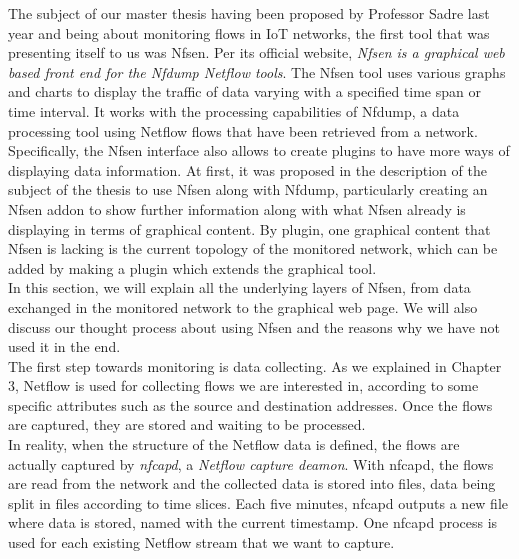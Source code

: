 The subject of our master thesis having been proposed by Professor Sadre last year and being about monitoring flows in IoT networks, the first tool that was presenting itself to us was Nfsen. Per its official website, \textit{Nfsen is a graphical web based front end for the Nfdump Netflow tools}. The Nfsen tool uses various graphs and charts to display the traffic of data varying with a specified time span or time interval. It works with the processing capabilities of Nfdump, a data processing tool using Netflow flows that have been retrieved from a network. Specifically, the Nfsen interface also allows to create plugins to have more ways of displaying data information. At first, it was proposed in the description of the subject of the thesis to use Nfsen along with Nfdump, particularly creating an Nfsen addon to show further information along with what Nfsen already is displaying in terms of graphical content. By plugin, one graphical content that Nfsen is lacking is the current topology of the monitored network, which can be added by making a plugin which extends the graphical tool.\\

In this section, we will explain all the underlying layers of Nfsen, from data exchanged in the monitored network to the graphical web page. We will also discuss our thought process about using Nfsen and the reasons why we have not used it in the end.\\

The first step towards monitoring is data collecting. As we explained in Chapter 3, Netflow is used for collecting flows we are interested in, according to some specific attributes such as the source and destination addresses. Once the flows are captured, they are stored and waiting to be processed. \\

In reality, when the structure of the Netflow data is defined, the flows are actually captured by \textit{nfcapd}, a \textit{Netflow capture deamon}. With nfcapd, the flows are read from the network and the collected data is stored into files, data being split in files according to time slices. Each five minutes, nfcapd outputs a new file where data is stored, named with the current timestamp. One nfcapd process is used for each existing Netflow stream that we want to capture.\\

